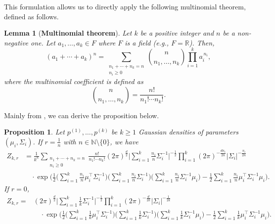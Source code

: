 \documentclass[accepted]{uai2026} %
\newtheorem{proposition}{Proposition}[section]
\newtheorem{lemma}{Lemma}[section]
\newcommand{\R}{\mathbb{R}}
\newcommand{\N}{\mathbb{N}}
\begin{document}
This formulation allows us to directly apply the following multinomial theorem, defined as follows.
\begin{lemma}[\textbf{Multinomial theorem}]\label{lemma: multinomial}
Let $k$ be a positive integer and $n$ be a non-negative one. 
Let $a_1,\dots,a_k \in F$ where $F$ is a field (e.g., $F=\R$). Then,
\begin{equation}\label{eq: multinomial}
(a_1 + \cdots + a_k)^n
=
\sum_{\substack{n_1+\cdots+n_k=n \\ n_i \ge 0}}
\binom{n}{n_1,\dots,n_k}
\prod_{i=1}^{k} a_i^{\,n_i},
\end{equation}
where the multinomial coefficient is defined as
\begin{equation}
\binom{n}{n_1,\dots,n_k}
=
\frac{n!}{n_1!\cdots n_k!}.
\end{equation}
\end{lemma}
Mainly from , we can derive the proposition below.
\begin{proposition}\label{proposition: z for 1 over n} Let $p^{(1)},\dots,p^{(k)}$ be $k \geq 1$ Gaussian densities of parameters $(\mu_i,\Sigma_i)$. If $r = \frac{1}{n}$ with $n \in \N \setminus \{0\}$, we have
\begin{equation}
\begin{aligned}
Z_{k,r}
&= \frac{1}{k^n}\sum_{\substack{n_1+\cdots+n_k=n \\ n_i \ge 0}} 
\frac{n!}{n_1!\cdots n_k!}
(2 \pi)^{\frac{d}{2}}
\Big| \sum_{i=1}^k \frac{n_i}{n} \Sigma_i^{-1} \Big|^{-\frac{1}{2}}
\prod_{i=1}^k (2\pi)^{-\frac{d n_i}{2n}}
| \Sigma_i |^{-\frac{n_i}{2n}} \\
&\quad \cdot
\exp\Bigg(
\frac{1}{2}
\Big(\sum_{i=1}^k \frac{n_i}{n} \mu_i^\top \Sigma_i^{-1}\Big)
\Big(\sum_{i=1}^k \frac{n_i}{n} \Sigma_i^{-1}\Big)
\Big(\sum_{i=1}^k \frac{n_i}{n} \Sigma_i^{-1} \mu_i\Big)
-\frac{1}{2}
\sum_{i=1}^k \frac{n_i}{n} \mu_i^\top \Sigma_i^{-1} \mu_i
\Bigg).
\end{aligned}
\end{equation}
If $r=0$, 
\begin{equation}
\begin{aligned}
Z_{k,r} = & (2 \pi)^{\frac{d}{2}}
\Big| \sum_{i=1}^k \frac{1}{k} \Sigma_i^{-1} \Big|^{-\frac{1}{2}}
\prod_{i=1}^k (2\pi)^{-\frac{d}{2k}}
| \Sigma_i |^{-\frac{1}{2k}} \\
&\quad \cdot \exp\Bigg(
\frac{1}{2}
\Big(\sum_{i=1}^k \frac{1}{k} \mu_i^\top \Sigma_i^{-1}\Big)
\Big(\sum_{i=1}^k \frac{1}{k} \Sigma_i^{-1}\Big)
\Big(\sum_{i=1}^k \frac{1}{k} \Sigma_i^{-1} \mu_i\Big)
-\frac{1}{2}
\sum_{i=1}^k \frac{1}{k} \mu_i^\top \Sigma_i^{-1} \mu_i
\Bigg).
\end{aligned}
\end{equation}

\end{proposition}
\end{document}
